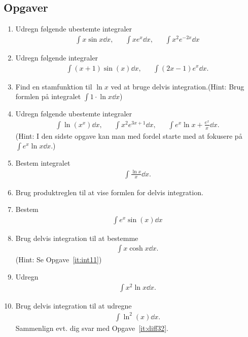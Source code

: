 \subsection{Opgaver}


\begin{enumerate}
	\item \label{it:int21} Udregn følgende ubestemte integraler
	\begin{align*}
	\int x\sin x\dd x,&& \int xe^x\dd x,&& \int x^2e^{-2x}\dd x
	\end{align*}
	
		\item Udregn følgende integraler
	\begin{align*}
	\int (x+1)\sin(x) \dd x,&& \int (2x-1) e^x \dd x.
	\end{align*}
	
	
	
	\item Find en stamfunktion til $\ln x$ ved at bruge delvis integration.(Hint: Brug formlen på integralet $\int 1\cdot \ln x\dd x$)
	
	\item\label{it:int23} Udregn følgende ubestemte integraler
	\begin{align*}
	\int \ln(x^x) \dd x,&& \int x^2 e^{3x+1}\dd x,&& \int e^x\ln x+ \frac{e^x}{x}\dd x.
	\end{align*}
	(Hint: I den sidste opgave kan man med fordel starte med at fokusere på $\int e^x\ln x \dd x$.)
	
	\item Bestem integralet 
	\begin{align*}
	\int \frac{\ln x}{x} \dd x.
	\end{align*}
	
	\item Brug produktreglen til at vise formlen for delvis integration.
	
	\item\label{it:int22} Bestem
	\begin{align*}
	\int e^{x}\sin(x) \dd x
	\end{align*}
	
	\item Brug delvis integration til at bestemme
	\begin{align*}
	\int x\cosh x \dd x.
	\end{align*}
	(Hint: Se Opgave~\ref{it:int11})
	
	\item Udregn 
	\begin{align*}
	\int x^2\ln x\dd x.
	\end{align*}
	
	\item Brug delvis integration til at udregne
	\begin{align*}
	\int \ln^2(x)\dd x.
	\end{align*}
	Sammenlign evt. dig svar med Opgave~\ref{it:diff32}.
\end{enumerate}